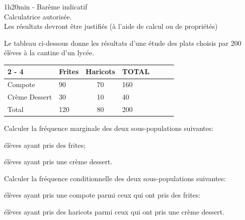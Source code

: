 \documentclass[11pt,a4paper]{article}  %
\begin{document}
	\graphicspath{{images/}}
	
	\begin{center}
		
		
	\end{center}

\begin{center}1h20min - Barème indicatif\\
Calculatrice autorisée.\\Les résultats devront être justifiés (à l'aide de calcul ou de propriétés)
\end{center}


Le tableau ci-dessous donne les résultats d'une étude des plats choisis par 200 élèves à la cantine d'un lycée.\\
\begin{tabular}{|l|Xc|Xc|Xc|}
	\cline { 2 - 4 } \multicolumn{1}{Xc|}{} & Frites & Haricots & TOTAL \\
	\hline Compote & 90 & 70 & 160 \\
	\hline Crème Dessert & 30 & 10 & 40 \\
	\hline Total & 120 & 80 & 200 \\
	\hline
\end{tabular}
\begin{enumMet}
	\item Calculer la fréquence marginale des deux sous-populations suivantes:
	\begin{enumMet}
		\item élèves ayant pris des frites;
		\item élèves ayant pris une crème dessert.
	\end{enumMet}
	\item Calculer la fréquence conditionnelle des deux sous-populations suivantes:
	\begin{enumMet}
		\item élèves ayant pris une compote parmi ceux qui ont pris des frites:
		\item élèves ayant pris des haricots parmi ceux qui ont pris une crème dessert.
	\end{enumMet}
\end{enumMet}
\end{document}
